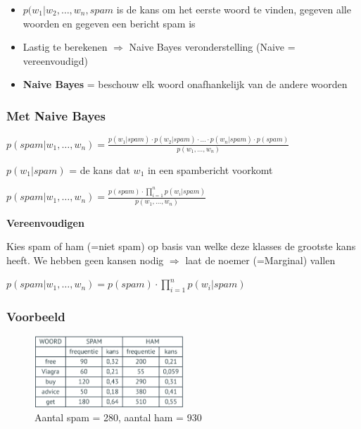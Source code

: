 \documentclass{article}
\begin{document}
\begin{itemize}
    \item $p(w_1 | w_2, \dots, w_n, spam$ is de kans om het eerste woord te vinden, gegeven alle woorden en gegeven een bericht spam is
    \item Lastig te berekenen $\Rightarrow$ Naive Bayes veronderstelling (Naive = vereenvoudigd)
    \item \textbf{Naive Bayes} = beschouw elk woord onafhankelijk van de andere woorden
\end{itemize}

\subsubsection{Met Naive Bayes}

\begin{center}
    $p(spam | w_1, \dots, w_n) = \frac{p(w_1 | spam) \cdot p(w_2 | spam) \cdot \dots \cdot p(w_n | spam) \cdot p(spam)}{p(w_1, \dots, w_n)}$
\end{center}

$p(w_1 | spam)$ = de kans dat $w_1$ in een spambericht voorkomt

\begin{center}
    $p(spam | w_1, \dots, w_n) = \frac{p(spam) \cdot \prod_{i=1}^n p(w_i | spam)}{p(w_1, \dots, w_n)}$
\end{center}

\textbf{Vereenvoudigen}

Kies spam of ham (=niet spam) op basis van welke deze klasses de grootste kans heeft.
We hebben geen kansen nodig $\Rightarrow$ laat de noemer (=Marginal) vallen

$p(spam | w_1, \dots, w_n) = p(spam) \cdot \prod_{i=1}^n p(w_i | spam)$

\subsubsection{Voorbeeld}

\begin{figure}[H]
    \centering
    \includegraphics[width=0.5\textwidth]{spamdetectie-voorbeeld.png}
    \caption{Aantal spam = 280, aantal ham = 930}
\end{figure}
\end{document}
